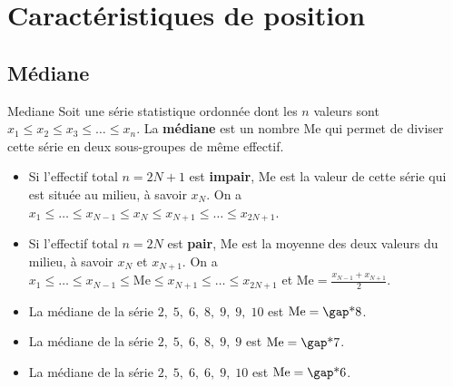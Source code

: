 \documentclass[10pt,a4paper,openany,twoside, eleve]{book}
\begin{document}

\newpage
\section{Caractéristiques de position}

\subsection{Médiane}

\begin{defi}{Mediane}{}
   Soit une série statistique ordonnée dont les $n$ valeurs sont $x_1\leqslant x_2 \leqslant x_3 \leqslant \dots \leqslant x_n$.
   La \textbf{médiane} est un nombre $\text{Me}$ qui permet de diviser cette série en deux sous-groupes de même effectif.
   \begin{itemize}
      \item Si l'effectif total $n=2N+1$ est \textbf{impair}, $\text{Me}$ est la valeur de cette série qui est située au milieu, à savoir $x_N$. On a  $x_1 \leqslant \dots \leqslant x_{N-1} \leqslant x_{N} \leqslant x_{N+1} \leqslant \dots \leqslant x_{2N+1}$.
      \item  Si l'effectif total $n=2N$ est \textbf{pair}, $\text{Me}$ est la moyenne des deux valeurs du milieu, à savoir $x_N$ et $x_{N+1}$. On a  $x_1 \leqslant \dots \leqslant x_{N-1} \leqslant \text{Me} \leqslant x_{N+1} \leqslant \dots \leqslant x_{2N+1}$ et $\text{Me}=\frac{x_{N-1}+x_{N+1}}{2}$.
   \end{itemize}
\end{defi}

\begin{ex}{}{}
   \begin{itemize}
      \item La médiane de la série $2,\;5,\;6,\;8,\;9,\;9,\;10$  est $\text{Me}=\troum{8}$.
      \item La médiane de la série $2,\;5,\;6,\;8,\;9,\;9$  est $\text{Me}=\troum{7}$.
      \item La médiane de la série $2,\;5,\;6,\;6,\;9,\;10$  est $\text{Me}=\troum{6}$.
   \end{itemize}
\end{ex}
\end{document}
